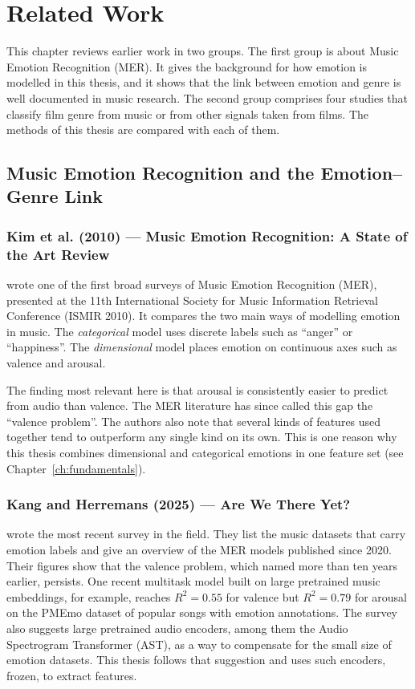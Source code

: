 \chapter{Related Work}
\label{ch:relatedwork}

This chapter reviews earlier work in two groups. The first group is about Music Emotion Recognition (MER). It gives the background for how emotion is modelled in this thesis, and it shows that the link between emotion and genre is well documented in music research. The second group comprises four studies that classify film genre from music or from other signals taken from films. The methods of this thesis are compared with each of them.

\section{Music Emotion Recognition and the Emotion--Genre Link}
\label{sec:relwork_mer}

\subsection{Kim et al. (2010) --- Music Emotion Recognition: A State of the Art Review}

\citet{kim2010music} wrote one of the first broad surveys of Music Emotion Recognition (MER), presented at the 11th International Society for Music Information Retrieval Conference (ISMIR 2010). It compares the two main ways of modelling emotion in music. The \emph{categorical} model uses discrete labels such as ``anger'' or ``happiness''. The \emph{dimensional} model places emotion on continuous axes such as valence and arousal.

The finding most relevant here is that arousal is consistently easier to predict from audio than valence. The MER literature has since called this gap the ``valence problem''. The authors also note that several kinds of features used together tend to outperform any single kind on its own. This is one reason why this thesis combines dimensional and categorical emotions in one feature set (see Chapter~\ref{ch:fundamentals}).

\subsection{Kang and Herremans (2025) --- Are We There Yet?}

\citet{kang2025there} wrote the most recent survey in the field. They list the music datasets that carry emotion labels and give an overview of the MER models published since 2020. Their figures show that the valence problem, which \citet{kim2010music} named more than ten years earlier, persists. One recent multitask model built on large pretrained music embeddings, for example, reaches $R^2 = 0.55$ for valence but $R^2 = 0.79$ for arousal on the PMEmo dataset of popular songs with emotion annotations. The survey also suggests large pretrained audio encoders, among them the Audio Spectrogram Transformer (AST), as a way to compensate for the small size of emotion datasets. This thesis follows that suggestion and uses such encoders, frozen, to extract features.

